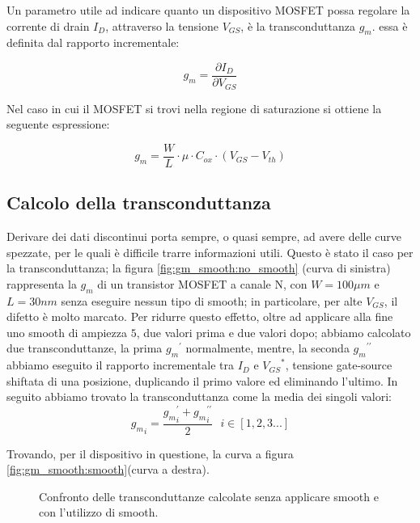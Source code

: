 Un parametro utile ad indicare quanto un dispositivo MOSFET possa regolare la corrente di drain $I_D$, attraverso la tensione $V_{GS}$, è la transconduttanza $g_m$. essa è definita dal rapporto incrementale:

$$g_m = \frac{\partial I_D}{\partial V_{GS}}$$

Nel caso in cui il MOSFET si trovi nella regione di saturazione si ottiene la seguente espressione:

$$g_m = \frac{W}{L} \cdot \mu \cdot C_{ox} \cdot (V_{GS} - V_{th})$$


\subsection{Calcolo della transconduttanza}
Derivare dei dati discontinui porta sempre, o quasi sempre, ad avere delle curve spezzate, per le quali è difficile trarre informazioni utili.
Questo è stato il caso per la transconduttanza; la figura \ref{fig:gm_smooth:no_smooth} (curva di sinistra) rappresenta la $g_m$ di un transistor  MOSFET a canale N, con $ W = 100\mu m$ e $L = 30 nm$ senza eseguire nessun tipo di smooth; in particolare, per alte $V_{GS}$, il difetto è molto marcato. Per ridurre questo effetto, oltre ad applicare alla fine uno smooth di ampiezza $5$, due valori prima e due valori dopo; abbiamo calcolato due transconduttanze, la prima ${g_m}^{\prime}$ normalmente, mentre, la seconda ${g_m}^{\prime \prime}$ abbiamo eseguito il rapporto incrementale tra $I_D$ e ${V_{GS}}^*$, tensione gate-source shiftata di una posizione, duplicando il primo valore ed eliminando l'ultimo. In seguito abbiamo trovato la transconduttanza come la media dei singoli valori: 
$${g_m}_i = \frac{{g_m}_i^{\prime} + {g_m}_i^{\prime \prime}}{2} \text{ } i \in [1 , 2 , 3 . . .]$$

Trovando, per il dispositivo in questione, la curva a figura \ref{fig:gm_smooth:smooth}(curva a destra).

\begin{figure}[ht]
    \centering

    \caption[Confronto $g_m$ senza utilizzo di smooth e con utilizzo di smooth]{Confronto delle transconduttanze calcolate senza applicare smooth e con l'utilizzo di smooth.}
    \label{fig:gm_smooth}
\end{figure}


